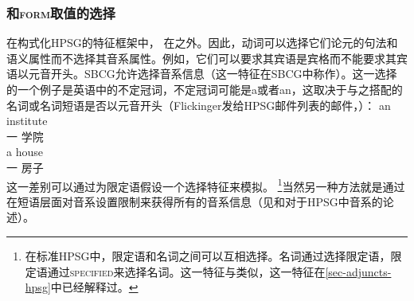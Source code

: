 \subsubsection{\phon 和\textsc{form}取值的选择}

在构式化HPSG的特征框架中， \phonvc 在\synsemc 之外。因此，动词可以选择它们论元的句法和语义属性而不选择其音系属性。例如，它们可以要求其宾语是宾格而不能要求其宾语以元音开头。SBCG允许选择音系信息（这一特征在SBCG中称作\formc）。这一选择的一个例子是英语中的不定冠词，不定冠词可能是a或者an，这取决于与之搭配的名词或名词短语是否以元音开头（Flickinger发给HPSG邮件列表的邮件，）：
\eal
\ex 
\gll an institute\\
     一 学院\\
\ex 
\gll a  house\\
     一 房子\\
\zl
这一差别可以通过为限定语假设一个选择特征来模拟。 \footnote{%
  在标准HPSG中，限定语和名词之间可以互相选择。名词通过\sprc 选择限定语，限定语通过\textsc{specified}来选择名词。这一特征与\modfc 类似，这一特征在\ref{sec-adjuncts-hpsg}中已经解释过。
}当然另一种方法就是通过在短语层面对音系设置限制来获得所有的音系信息（见\citet{BK94b}和\citet{Walther99a-u}对于HPSG中音系的论述）。

